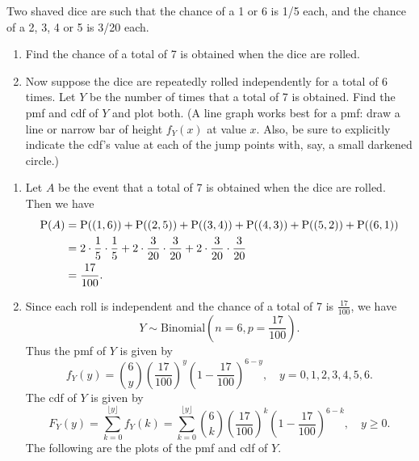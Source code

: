 \documentclass[12pt]{article}
\newcommand{\Prob}{{\rm P}}
\newenvironment{problem}[2][Problem]{\begin{trivlist}
\item[\hskip \labelsep {\bfseries #1}\hskip \labelsep {\bfseries #2.}]}
{\end{trivlist}}
\begin{document}
\begin{problem}{6}
  Two shaved dice are such that the chance of a 1 or 6 is 1/5 each,
  and the chance of a 2, 3, 4 or 5 is 3/20 each.
  \begin{enumerate}
    \item Find the chance of a total of 7 is obtained when the dice
    are rolled.
    \item Now suppose the dice are repeatedly rolled independently
    for a total of 6 times. Let $Y$ be the number of times that a total
    of 7 is obtained. Find the pmf and cdf of $Y$ and plot both.
    (A line graph works best for a pmf: draw a line or narrow bar of
    height $f_Y(x)$ at value $x$. Also, be sure to explicitly indicate
    the cdf's value at each of the jump points with, say, a small
    darkened circle.)
  \end{enumerate}
  \begin{enumerate}
    \item Let $A$ be the event that a total of 7 is obtained when the
    dice are rolled. Then we have
    \[
    \begin{aligned}
      \Prob(A) &= \Prob((1,6)) + \Prob((2,5)) + \Prob((3,4))
      + \Prob((4,3)) + \Prob((5,2)) + \Prob((6,1))\\
      &= 2\cdot\frac{1}{5}\cdot\frac{1}{5} + 2\cdot\frac{3}{20}\cdot\frac{3}{20}
      + 2\cdot\frac{3}{20}\cdot\frac{3}{20}\\ 
      &= \frac{17}{100}.
    \end{aligned}
    \]
    \item Since each roll is independent and the chance of a total of 7
    is $\frac{17}{100}$, we have
    \[
      Y \sim \text{Binomial}\left(n=6, p=\frac{17}{100}\right).
    \]
    Thus the pmf of $Y$ is given by
    \[
      f_Y(y) = \binom{6}{y}\left(\frac{17}{100}\right)^y
      \left(1-\frac{17}{100}\right)^{6-y}, \quad y=0,1,2,3,4,5,6.
    \]
    The cdf of $Y$ is given by
    \[
      F_Y(y) = \sum_{k=0}^{\lfloor y \rfloor} f_Y(k)
      = \sum_{k=0}^{\lfloor y \rfloor} \binom{6}{k}
      \left(\frac{17}{100}\right)^k
      \left(1-\frac{17}{100}\right)^{6-k}, \quad y \geq 0.
    \]
    The following are the plots of the pmf and cdf of $Y$.
    \begin{center}

\end{center}
\end{enumerate}
\end{problem}
\end{document}
